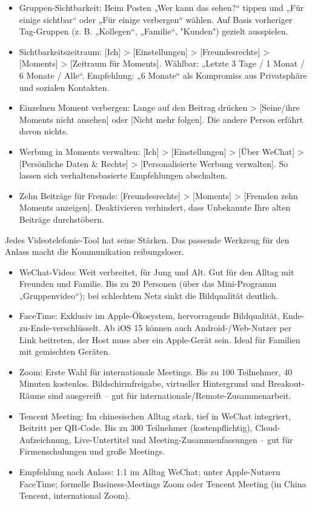 
\begin{itemize}
  \item Gruppen-Sichtbarkeit: Beim Posten „Wer kann das sehen?“ tippen und „Für einige sichtbar“ oder „Für einige verbergen“ wählen. Auf Basis vorheriger Tag-Gruppen (z. B. „Kollegen“, „Familie“, "Kunden") gezielt ausspielen.
  \item Sichtbarkeitszeitraum: [Ich] > [Einstellungen] > [Freundesrechte] > [Moments] > [Zeitraum für Moments]. Wählbar: „Letzte 3 Tage / 1 Monat / 6 Monate / Alle“. Empfehlung: „6 Monate“ als Kompromiss aus Privatsphäre und sozialen Kontakten.
  \item Einzelnen Moment verbergen: Lange auf den Beitrag drücken > [Seine/ihre Moments nicht ansehen] oder [Nicht mehr folgen]. Die andere Person erfährt davon nichts.
  \item Werbung in Moments verwalten: [Ich] > [Einstellungen] > [Über WeChat] > [Persönliche Daten \& Rechte] > [Personalisierte Werbung verwalten]. So lassen sich verhaltensbasierte Empfehlungen abschalten.
  \item Zehn Beiträge für Fremde: [Freundesrechte] > [Moments] > [Fremden zehn Moments anzeigen]. Deaktivieren verhindert, dass Unbekannte Ihre alten Beiträge durchstöbern.
\end{itemize}


Jedes Videotelefonie-Tool hat seine Stärken. Das passende Werkzeug für den Anlass macht die Kommunikation reibungsloser.

\begin{itemize}
  \item WeChat-Video: Weit verbreitet, für Jung und Alt. Gut für den Alltag mit Freunden und Familie. Bis zu 20 Personen (über das Mini-Programm „Gruppenvideo“); bei schlechtem Netz sinkt die Bildqualität deutlich.
  \item FaceTime: Exklusiv im Apple-Ökosystem, hervorragende Bildqualität, Ende-zu-Ende-verschlüsselt. Ab iOS 15 können auch Android-/Web-Nutzer per Link beitreten, der Host muss aber ein Apple-Gerät sein. Ideal für Familien mit gemischten Geräten.
  \item Zoom: Erste Wahl für internationale Meetings. Bis zu 100 Teilnehmer, 40 Minuten kostenlos. Bildschirmfreigabe, virtueller Hintergrund und Breakout-Räume sind ausgereift – gut für internationale/Remote-Zusammenarbeit.
  \item Tencent Meeting: Im chinesischen Alltag stark, tief in WeChat integriert, Beitritt per QR-Code. Bis zu 300 Teilnehmer (kostenpflichtig), Cloud-Aufzeichnung, Live-Untertitel und Meeting-Zusammenfassungen – gut für Firmenschulungen und große Meetings.
  \item Empfehlung nach Anlass: 1:1 im Alltag WeChat; unter Apple-Nutzern FaceTime; formelle Business-Meetings Zoom oder Tencent Meeting (in China Tencent, international Zoom).
\end{itemize}

